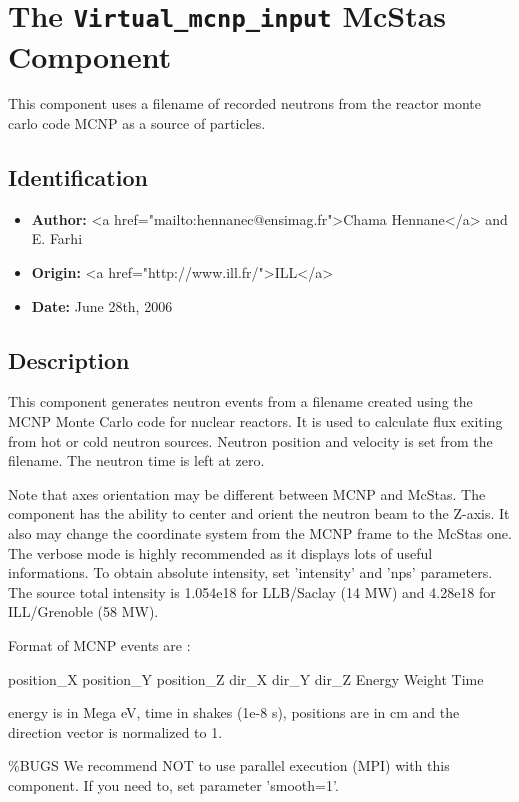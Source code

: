 \section{The \texttt{Virtual\_mcnp\_input} McStas Component}
This component uses a filename of recorded neutrons from the reactor monte carlo
code MCNP as a source of particles.

\subsection*{Identification}
\begin{itemize}
  \item \textbf{Author:} \textless{}a href="mailto:hennanec@ensimag.fr"\textgreater{}Chama Hennane\textless{}/a\textgreater{} and E. Farhi
  \item \textbf{Origin:} \textless{}a href="http://www.ill.fr/"\textgreater{}ILL\textless{}/a\textgreater{}
  \item \textbf{Date:} June 28th, 2006
\end{itemize}

\subsection*{Description}
This component generates neutron events from a filename created using the MCNP Monte Carlo code for nuclear reactors. It is used to calculate flux exiting from hot or cold neutron sources. Neutron position and velocity is set from the filename. The neutron time is left at zero.

Note that axes orientation may be different between MCNP and McStas. The component has the ability to center and orient the neutron beam to the Z-axis. It also may change the coordinate system from the MCNP frame to the McStas one. The verbose mode is highly recommended as it displays lots of useful informations. To obtain absolute intensity, set 'intensity' and 'nps' parameters. The source total intensity is 1.054e18 for LLB/Saclay (14 MW) and 4.28e18 for ILL/Grenoble (58 MW).

Format of MCNP events are :

position\_X position\_Y position\_Z dir\_X dir\_Y dir\_Z Energy Weight Time

energy is in Mega eV, time in shakes (1e-8 s), positions are in cm and the direction vector is normalized to 1.

\%BUGS We recommend NOT to use parallel execution (MPI) with this component. If you need to, set parameter 'smooth=1'.

